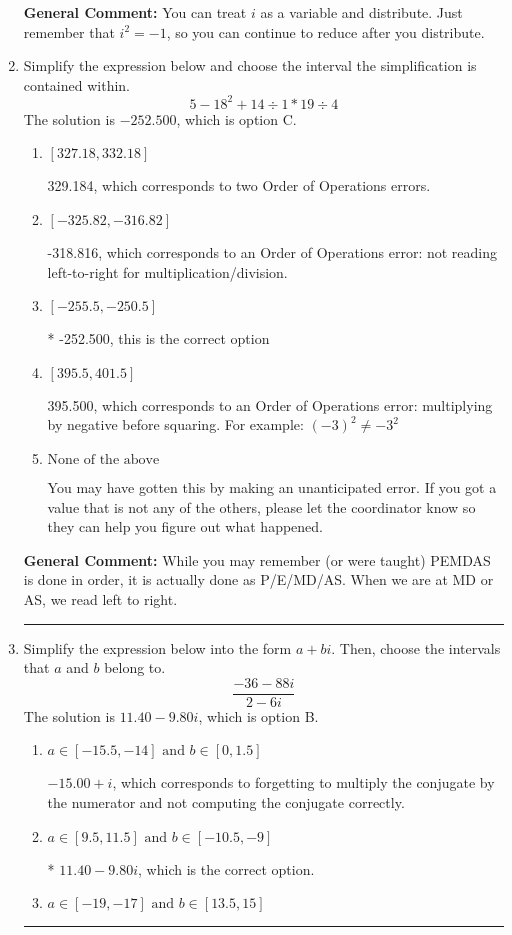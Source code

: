 \documentclass{extbook}[14pt]
\newcommand{\litem}[1]{\item #1

\rule{\textwidth}{0.4pt}}
\begin{document}
\begin{enumerate}
{\textbf{General Comment:} You can treat $i$ as a variable and distribute. Just remember that $i^2=-1$, so you can continue to reduce after you distribute.
}
\litem{
Simplify the expression below and choose the interval the simplification is contained within.
\[ 5 - 18^2 + 14 \div 1 * 19 \div 4 \]The solution is \( -252.500 \), which is option C.\begin{enumerate}[label=\Alph*.]
\item \( [327.18, 332.18] \)

 329.184, which corresponds to two Order of Operations errors.
\item \( [-325.82, -316.82] \)

 -318.816, which corresponds to an Order of Operations error: not reading left-to-right for multiplication/division.
\item \( [-255.5, -250.5] \)

* -252.500, this is the correct option
\item \( [395.5, 401.5] \)

 395.500, which corresponds to an Order of Operations error: multiplying by negative before squaring. For example: $(-3)^2 \neq -3^2$
\item \( \text{None of the above} \)

 You may have gotten this by making an unanticipated error. If you got a value that is not any of the others, please let the coordinator know so they can help you figure out what happened.
\end{enumerate}

\textbf{General Comment:} While you may remember (or were taught) PEMDAS is done in order, it is actually done as P/E/MD/AS. When we are at MD or AS, we read left to right.
}
\litem{
Simplify the expression below into the form $a+bi$. Then, choose the intervals that $a$ and $b$ belong to.
\[ \frac{-36 - 88 i}{2 - 6 i} \]The solution is \( 11.40  - 9.80 i \), which is option B.\begin{enumerate}[label=\Alph*.]
\item \( a \in [-15.5, -14] \text{ and } b \in [0, 1.5] \)

 $-15.00 + i$, which corresponds to forgetting to multiply the conjugate by the numerator and not computing the conjugate correctly.
\item \( a \in [9.5, 11.5] \text{ and } b \in [-10.5, -9] \)

* $11.40  - 9.80 i$, which is the correct option.
\item \( a \in [-19, -17] \text{ and } b \in [13.5, 15] \)


\end{enumerate}}
\end{enumerate}
\end{document}

